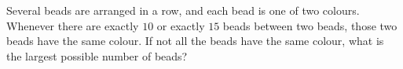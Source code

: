 Several beads are arranged in a row, and each bead is one of two colours. Whenever there are exactly $10$ or exactly $15$ beads between two beads, those two beads have the same colour. If not all the beads have the same colour, what is the largest possible number of beads?
